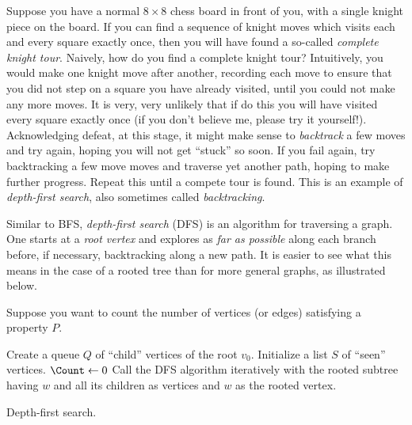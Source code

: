 Suppose you have a normal $8 \times 8$ chess board in front of you,
with a single knight piece on the board. If you can find a sequence of
knight moves which visits each and every square exactly once, then you
will have found a so-called \emph{complete knight tour}.
Naively, how do you find a complete knight tour? Intuitively, you
would make one knight move after another, recording each move to
ensure that you did not step on a square you have already visited,
until you could not make any more moves. It is very, very unlikely
that if do this you will have visited every square exactly once (if
you don't believe me, please try it yourself!). Acknowledging defeat,
at this stage, it might make sense to \emph{backtrack} a few moves and
try again, hoping you will not get ``stuck'' so soon. If you fail
again, try backtracking a few move moves and traverse yet another
path, hoping to make further progress. Repeat this until a compete
tour is found. This is an example of \emph{depth-first search}, also
sometimes called \emph{backtracking}.

Similar to BFS, \emph{depth-first search} (DFS) is an algorithm for
traversing a graph. One starts at a \emph{root vertex} and explores as
\emph{far as possible} along each branch before, if necessary,
backtracking along a new path. It is easier to see what this means in
the case of a rooted tree than for more general graphs, as illustrated
below.

Suppose you want to count the number of vertices (or edges) satisfying
a property $P$.

\begin{algorithm}[!htpb]
\SetLine
\dontprintsemicolon  %
\BlankLine
Create a queue $Q$ of ``child'' vertices of the root $v_0$.\;
Initialize a list $S$ of ``seen'' vertices.\;
$\Count \leftarrow 0$\;
Call the DFS algorithm iteratively with the rooted subtree having $w$
and all its children as vertices and $w$ as the rooted vertex.
\caption{Depth-first search.}
\label{alg:graph_algorithms:depth_first_search}
\end{algorithm}

